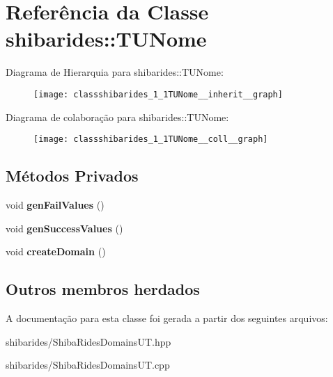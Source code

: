 \hypertarget{classshibarides_1_1TUNome}{}\section{Referência da Classe shibarides\+:\+:T\+U\+Nome}
\label{classshibarides_1_1TUNome}


Diagrama de Hierarquia para shibarides\+:\+:T\+U\+Nome\+:\nopagebreak
\begin{figure}[H]
\begin{center}
\leavevmode
\texttt{[image: classshibarides\_1\_1TUNome\_\_inherit\_\_graph]}
\end{center}
\end{figure}


Diagrama de colaboração para shibarides\+:\+:T\+U\+Nome\+:\nopagebreak
\begin{figure}[H]
\begin{center}
\leavevmode
\texttt{[image: classshibarides\_1\_1TUNome\_\_coll\_\_graph]}
\end{center}
\end{figure}
\subsection*{Métodos Privados}
\begin{DoxyCompactItemize}
\item 
void {\bfseries gen\+Fail\+Values} ()\hypertarget{classshibarides_1_1TUNome_a2d81b0c27af9e0663febd2db09e6a483}{}\label{classshibarides_1_1TUNome_a2d81b0c27af9e0663febd2db09e6a483}

\item 
void {\bfseries gen\+Success\+Values} ()\hypertarget{classshibarides_1_1TUNome_aaf7bbd0e30120b0f6f21669a39922557}{}\label{classshibarides_1_1TUNome_aaf7bbd0e30120b0f6f21669a39922557}

\item 
void {\bfseries create\+Domain} ()\hypertarget{classshibarides_1_1TUNome_ac798261c1f2048f4f792a6e12643b7d2}{}\label{classshibarides_1_1TUNome_ac798261c1f2048f4f792a6e12643b7d2}

\end{DoxyCompactItemize}
\subsection*{Outros membros herdados}


A documentação para esta classe foi gerada a partir dos seguintes arquivos\+:\begin{DoxyCompactItemize}
\item 
shibarides/Shiba\+Rides\+Domains\+U\+T.\+hpp\item 
shibarides/Shiba\+Rides\+Domains\+U\+T.\+cpp\end{DoxyCompactItemize}
